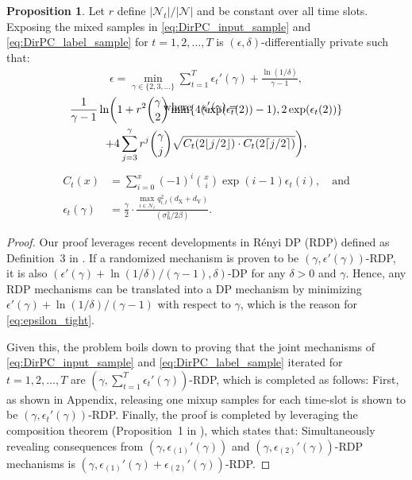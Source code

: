 \documentclass[conference,10pt]{IEEEtran}
\theoremstyle{definition}
\theoremstyle{definition}
\newtheorem{proposition}{Proposition}
\begin{document}
\begin{proposition}
	\label{lemma:epsilon_tight}
	Let $r$ define $|\mathcal{N}_t|/|\mathcal{N}|$ and be constant over all time slots.
	Exposing the mixed samples in \eqref{eq:DirPC_input_sample} and \eqref{eq:DirPC_label_sample} for $t = 1, 2, \dots, T$ is $(\epsilon, \delta)$-differentially private such that:
	\begin{align}
		\label{eq:epsilon_tight}
		\textstyle\epsilon = \min_{\gamma \in \{2, 3, \dots\}} \sum_{t = 1}^{T}\epsilon_t'({\gamma}) + \frac{\ln(1/\delta)}{\gamma - 1},
	\end{align}
	\vspace{-2em}
	\begin{multline} \vspace{-20pt}
		\hspace{-10pt}\text{where}\quad \epsilon_t'({\gamma}) = \\
		\frac{1}{\gamma - 1}\ln\biggl(1 + r^2 \binom{\gamma}{2} \min\{4(\exp(\epsilon_t(2)) - 1), 2\exp(\epsilon_t(2))\} \\
		+ 4\sum_{j = 3}^{\gamma}r^j\binom{\gamma}{j}\sqrt{C_t(2\lfloor j/2\rfloor)\cdot C_t(2\lceil j/2\rceil)}\biggr),
	\end{multline}\vspace{-1.5em}
	\begin{align}
		C_t(x)             & = \sum_{i = 0}^{x}(-1)^{i}\binom{x}{i}\exp(i - 1)\epsilon_t(i),\quad \text{and}               \label{eq:C_x}                                                   \\
		\epsilon_t(\gamma) & = \frac{\gamma}{2} \cdot \frac{\max_{i\in\mathcal{N}_t} q^2_{i, t}(d_{\mathrm{X}} + d_{\mathrm{Y}})}{(\sigma_{\mathrm{n}}^2/2\beta)}.\label{eq:renyi_distance}
	\end{align}
	\begin{proof}
		Our proof leverages recent developments in R{\'e}nyi DP (RDP) defined as Definition~3 in \cite{mironov2017renyi}.
		If a randomized mechanism is proven to be $(\gamma, \epsilon'(\gamma))$-RDP, it is also $(\epsilon'(\gamma) + \ln (1/\delta)/(\gamma - 1), \delta)$-DP for any $\delta > 0$ and $\gamma$.
		Hence, any RDP mechanisms can be translated into a DP mechanism by minimizing $\epsilon'(\gamma) + \ln (1/\delta)/(\gamma - 1)$ with respect to $\gamma$, which is the reason for \eqref{eq:epsilon_tight}.

		Given this, the problem boils down to proving that the joint mechanisms of \eqref{eq:DirPC_input_sample} and \eqref{eq:DirPC_label_sample} iterated for $t = 1, 2, \dots, T$ are  $(\gamma, \sum_{t = 1}^{T}\epsilon_t'(\gamma))$-RDP, which is completed as follows:
		First, as shown in Appendix, releasing one mixup samples for each time-slot is shown to be $(\gamma, \epsilon_t'(\gamma))$-RDP.
		Finally, the proof is completed by leveraging the composition theorem (Proposition~1 in \cite{mironov2017renyi}), which states that:
		Simultaneously revealing consequences from $(\gamma, \epsilon_{(1)}'(\gamma))$ and $(\gamma, \epsilon_{(2)}'(\gamma))$-RDP mechanisms is $(\gamma, \epsilon_{(1)}'(\gamma) + \epsilon_{(2)}'(\gamma))$-RDP.
	\end{proof}
\end{proposition}
\end{document}
